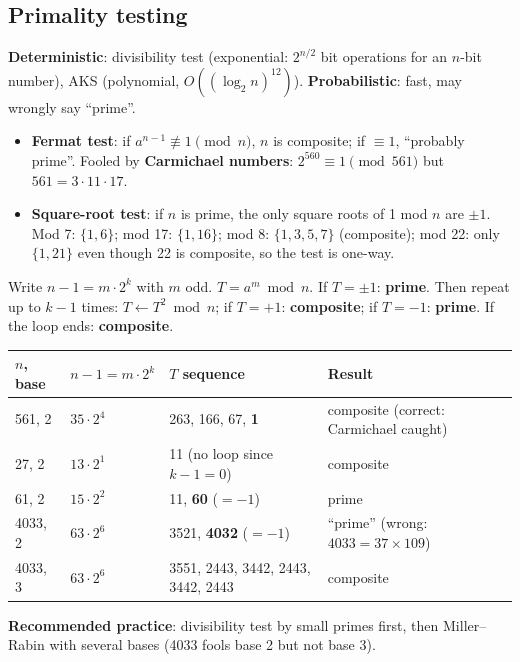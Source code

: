 \subsection{Primality testing}
\textbf{Deterministic}: divisibility test (exponential: $2^{n/2}$ bit operations for an $n$-bit number), AKS (polynomial, $O((\log_2 n)^{12})$). \textbf{Probabilistic}: fast, may wrongly say ``prime''.
\begin{itemize}
  \item \textbf{Fermat test}: if $a^{n-1} \not\equiv 1 \pmod n$, $n$ is composite; if $\equiv 1$, ``probably prime''. Fooled by \textbf{Carmichael numbers}: $2^{560} \equiv 1 \pmod{561}$ but $561 = 3 \cdot 11 \cdot 17$.
  \item \textbf{Square-root test}: if $n$ is prime, the only square roots of 1 mod $n$ are $\pm1$. Mod 7: $\{1, 6\}$; mod 17: $\{1, 16\}$; mod 8: $\{1, 3, 5, 7\}$ (composite); mod 22: only $\{1, 21\}$ even though 22 is composite, so the test is one-way.
\end{itemize}
\begin{keybox}[title=Miller--Rabin test (base $a$)]
Write $n - 1 = m \cdot 2^k$ with $m$ odd. $T = a^m \bmod n$. If $T = \pm1$: \textbf{prime}. Then repeat up to $k - 1$ times: $T \leftarrow T^2 \bmod n$; if $T = +1$: \textbf{composite}; if $T = -1$: \textbf{prime}. If the loop ends: \textbf{composite}.
\end{keybox}
\begin{center}\small
\begin{tabular}{@{}llll@{}}
\toprule
$n$, base & $n - 1 = m \cdot 2^k$ & $T$ sequence & Result\\
\midrule
561, 2 & $35 \cdot 2^4$ & 263, 166, 67, \textbf{1} & composite (correct: Carmichael caught)\\
27, 2 & $13 \cdot 2^1$ & 11 (no loop since $k - 1 = 0$) & composite\\
61, 2 & $15 \cdot 2^2$ & 11, \textbf{60} ($= -1$) & prime\\
4033, 2 & $63 \cdot 2^6$ & 3521, \textbf{4032} ($= -1$) & ``prime'' (wrong: $4033 = 37 \times 109$)\\
4033, 3 & $63 \cdot 2^6$ & 3551, 2443, 3442, 2443, 3442, 2443 & composite\\
\bottomrule
\end{tabular}
\end{center}
\textbf{Recommended practice}: divisibility test by small primes first, then Miller--Rabin with several bases (4033 fools base 2 but not base 3).

